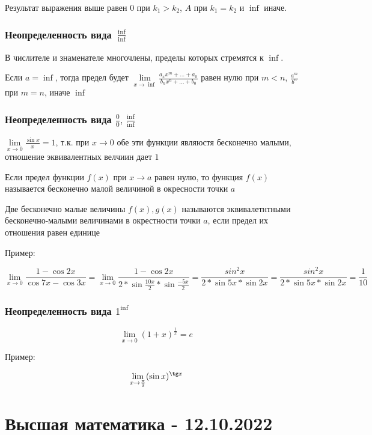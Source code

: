 \documentclass{article}
\begin{document}
Результат выражения выше равен $0$ при $k_1 > k_2$, $A$ при $k_1 = k_2$ и $\inf$ иначе.  

\subsubsection{Неопределенность вида $\frac{\inf}{\inf}$}

В числителе и знаменателе многочлены, пределы которых стремятся к $\inf$.

Если $a = \inf$, тогда предел будет $\lim\limits_{x \to \inf} \frac{a_{x}x^{m} + ... + a_0}{b_{n}x^{n} + ... + b_0}$ равен нулю при $m < n$, $\frac{a^m}{b^n}$при $m = n$, иначе $\inf$

\subsubsection{Неопределенность вида $\frac{0}{0}, \frac{\inf}{\inf}$}

$\lim\limits_{x \to 0} \frac{\sin{x}}{x} = 1$, т.к. при $x \to 0$ обе эти функции являюстя бесконечно малыми, отношение эквивалентных велчиин дает $1$

Если предел функции $f(x)$ при $x \to a$ равен нулю, то функция $f(x)$ называется бесконечно малой величиной в окресности точки $a$

Две бесконечно малые величины $f(x), g(x)$ называются эквивалетнтными бесконечно-малыми величинами в окрестности точки $a$, если предел их отношения равен единице

Пример:

$$
\lim\limits_{x \to 0} \frac{1 - \cos{2x}}{\cos 7x - \cos 3x} = \lim\limits_{x \to 0} \frac{1 - \cos{2x}}{2 * \sin{\frac{10x}{2}} * \sin{\frac{-5x}{2}}} = \frac{sin^2{x}}{2 * \sin{5x} * \sin{2x}} = \frac{sin^2{x}}{2 * \sin{5x} * \sin{2x}} = \frac{1}{10}
$$

\subsubsection{Неопределенность вида $1^{\inf}$}

$$\lim\limits_{x \to 0} (1 + x)^{\frac{1}{x}} = e$$

Пример:

$$
\lim\limits_{x \to \frac{\pi}{2}} (\sin x)^{\tg x}
$$

\pagebreak

\section{Высшая математика - 12.10.2022}
\end{document}
